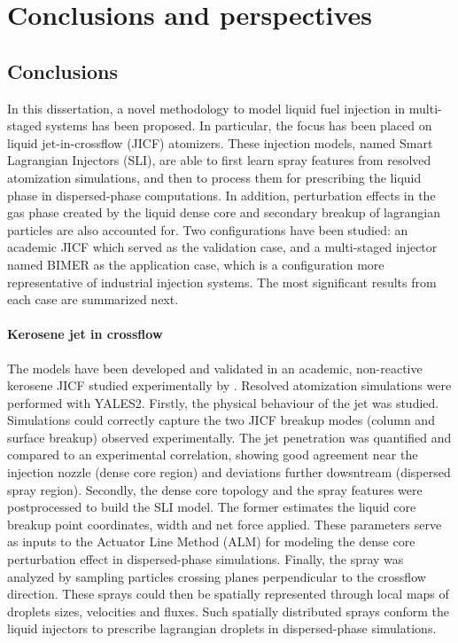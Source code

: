 \chapter{Conclusions and perspectives}

\section*{Conclusions}

In this dissertation, a novel methodology to model liquid fuel injection in multi-staged systems has been proposed. In particular, the focus has been placed on liquid jet-in-crossflow (JICF) atomizers. These injection models, named Smart Lagrangian Injectors (SLI), are able to first learn spray features from resolved atomization simulations, and then to process them for prescribing the liquid phase in dispersed-phase computations. In addition, perturbation effects in the gas phase created by the liquid dense core and secondary breakup of lagrangian particles are also accounted for. Two configurations have been studied: an academic JICF which served as the validation case, and a multi-staged injector named BIMER as the application case, which is a configuration more representative of industrial injection systems. The most significant results from each case are summarized next.


\subsubsection*{Kerosene jet in crossflow}

The models have been developed and validated in an academic, non-reactive kerosene JICF studied experimentally by . Resolved atomization simulations were performed with YALES2. Firstly, the physical behaviour of the jet was studied. Simulations could correctly capture the two JICF breakup modes (column and surface breakup) observed experimentally.  The jet penetration was quantified and compared to an experimental correlation, showing good agreement near the injection nozzle (dense core region) and deviations further dowsntream (dispersed spray region). Secondly, the dense core topology and the spray features were postprocessed to build the SLI model. The former estimates the liquid core breakup point coordinates, width and net force applied. These parameters serve as inputs to the Actuator Line Method (ALM) for modeling the dense core perturbation effect in dispersed-phase simulations. Finally, the spray was analyzed by sampling particles crossing planes perpendicular to the crossflow direction. These sprays could then be spatially represented through local maps of droplets sizes, velocities and fluxes. Such spatially distributed sprays conform the liquid injectors to prescribe lagrangian droplets in dispersed-phase simulations. \\

